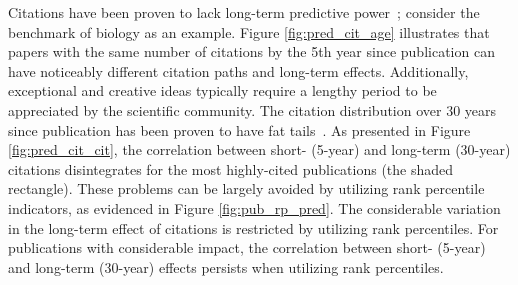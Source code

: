 Citations have been proven to lack long-term predictive power~\cite{Wang2013}; consider the benchmark of biology as an example. Figure \ref{fig:pred_cit_age} illustrates that papers with the same number of citations by the 5th year since publication can have noticeably different citation paths and long-term effects. Additionally, exceptional and creative ideas typically require a lengthy period to be appreciated by the scientific community. The citation distribution over $30$ years since publication has been proven to have fat tails~\cite{Wang2013}. As presented in Figure \ref{fig:pred_cit_cit}, the correlation between short- (5-year) and long-term (30-year) citations disintegrates for the most highly-cited publications (the shaded rectangle). These problems can be largely avoided by utilizing rank percentile indicators, as evidenced in Figure \ref{fig:pub_rp_pred}. The considerable variation in the long-term effect of citations is restricted by utilizing rank percentiles. For publications with considerable impact, the correlation between short- (5-year) and long-term (30-year) effects persists when utilizing rank percentiles.

